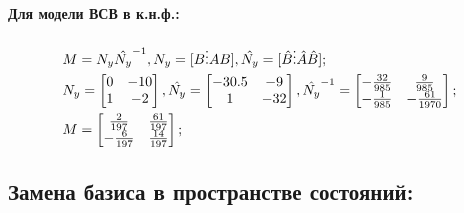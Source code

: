 \paragraph{Для модели ВСВ в к.н.ф.:}

\begin{equation}
	\begin{split}	
		&M=N_y\Hat{N_y}^{-1}, N_y=[B\vdots AB], \Hat{N_y}=[\Hat{B}\vdots \Hat{A}\Hat{B}];\\
		&N_y=\begin{bmatrix}
			0 & -10\\
			1 & -2\\
		\end{bmatrix}, \Hat{N_y}=\begin{bmatrix}
					   		-30.5 & -9\\
					   		1 & -32\\
					   \end{bmatrix}, \Hat{N_y}^{-1}=\begin{bmatrix}
					   						-\frac{32}{985} & \frac{9}{985}\\
					   						-\frac{1}{985} & -\frac{61}{1970}\\
					   				  \end{bmatrix};\\
		&M=\begin{bmatrix}
			\frac{2}{197} & \frac{61}{197}\\
			-\frac{6}{197} & \frac{14}{197}\\
		\end{bmatrix};\\
	\end{split}
\end{equation}

\newpage

\subsection{Замена базиса в пространстве состояний:}

